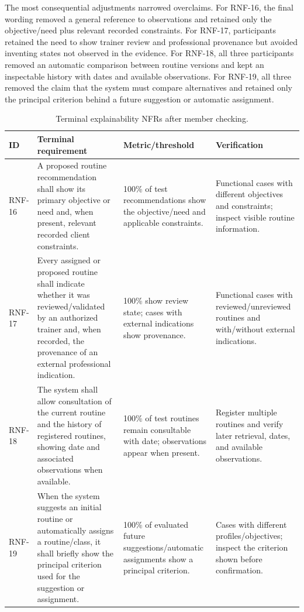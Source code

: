\documentclass[pdflatex,sn-basic]{sn-jnl}
\begin{document}
The most consequential adjustments narrowed overclaims. For RNF-16, the final wording removed a general reference to observations and retained only the objective/need plus relevant recorded constraints. For RNF-17, participants retained the need to show trainer review and professional provenance but avoided inventing states not observed in the evidence. For RNF-18, all three participants removed an automatic comparison between routine versions and kept an inspectable history with dates and available observations. For RNF-19, all three removed the claim that the system must compare alternatives and retained only the principal criterion behind a future suggestion or automatic assignment.

\begin{table}[H]
\caption{Terminal explainability NFRs after member checking.}\label{tab:rnf}
\centering\small
\begin{tabularx}{\textwidth}{@{}p{1.5cm}X p{3.1cm}p{3.2cm}@{}}
\toprule
ID & Terminal requirement & Metric/threshold & Verification \\
\midrule
RNF-16 & A proposed routine recommendation shall show its primary objective or need and, when present, relevant recorded client constraints. & 100\% of test recommendations show the objective/need and applicable constraints. & Functional cases with different objectives and constraints; inspect visible routine information.\\
RNF-17 & Every assigned or proposed routine shall indicate whether it was reviewed/validated by an authorized trainer and, when recorded, the provenance of an external professional indication. & 100\% show review state; cases with external indications show provenance. & Functional cases with reviewed/unreviewed routines and with/without external indications.\\
RNF-18 & The system shall allow consultation of the current routine and the history of registered routines, showing date and associated observations when available. & 100\% of test routines remain consultable with date; observations appear when present. & Register multiple routines and verify later retrieval, dates, and available observations.\\
RNF-19 & When the system suggests an initial routine or automatically assigns a routine/class, it shall briefly show the principal criterion used for the suggestion or assignment. & 100\% of evaluated future suggestions/automatic assignments show a principal criterion. & Cases with different profiles/objectives; inspect the criterion shown before confirmation.\\
\bottomrule
\end{tabularx}
\end{table}
\end{document}
